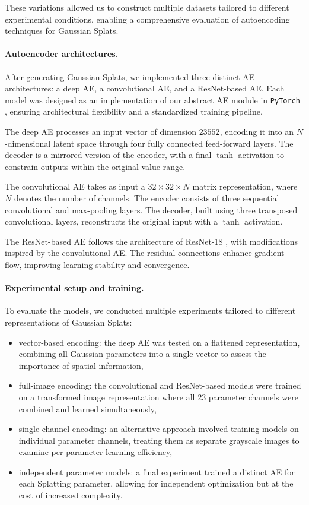 These variations allowed us to construct multiple datasets tailored to different experimental conditions, enabling a comprehensive evaluation of autoencoding techniques for Gaussian Splats.

\paragraph{Autoencoder architectures.}
After generating Gaussian Splats, we implemented three distinct AE architectures: a deep AE, a convolutional AE, and a ResNet-based AE. Each model was designed as an implementation of our abstract AE module in \texttt{PyTorch} \cite{paszke2019pytorchai}, ensuring architectural flexibility and a standardized training pipeline.

The deep AE processes an input vector of dimension $23552$, encoding it into an $N$-dimensional latent space through four fully connected feed-forward layers. The decoder is a mirrored version of the encoder, with a final $\tanh$ activation to constrain outputs within the original value range.

The convolutional AE takes as input a $32 \times 32 \times N$ matrix representation, where $N$ denotes the number of channels. The encoder consists of three sequential convolutional and max-pooling layers. The decoder, built using three transposed convolutional layers, reconstructs the original input with a $\tanh$ activation.

The ResNet-based AE follows the architecture of ResNet-18 \cite{he2015deeprl}, with modifications inspired by the convolutional AE. The residual connections enhance gradient flow, improving learning stability and convergence.

\paragraph{Experimental setup and training.}
To evaluate the models, we conducted multiple experiments tailored to different representations of Gaussian Splats:

\begin{itemize}
\item vector-based encoding: the deep AE was tested on a flattened representation, combining all Gaussian parameters into a single vector to assess the importance of spatial information,
\item full-image encoding: the convolutional and ResNet-based models were trained on a transformed image representation where all 23 parameter channels were combined and learned simultaneously,
\item single-channel encoding: an alternative approach involved training models on individual parameter channels, treating them as separate grayscale images to examine per-parameter learning efficiency,
\item independent parameter models: a final experiment trained a distinct AE for each Splatting parameter, allowing for independent optimization but at the cost of increased complexity.
\end{itemize}

